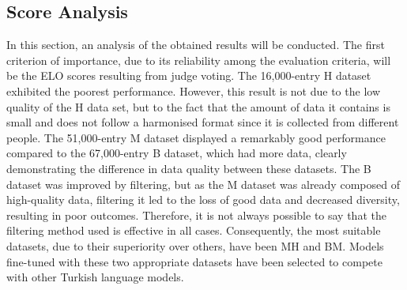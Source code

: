\documentclass[conference]{IEEEtran}
\begin{document}

\subsection{Score Analysis}

In this section, an analysis of the obtained results will be conducted. The first criterion of importance, due to its reliability among the evaluation criteria, will be the ELO scores resulting from judge voting. The 16,000-entry H dataset exhibited the poorest performance. However, this result is not due to the low quality of the H data set, but to the fact that the amount of data it contains is small and does not follow a harmonised format since it is collected from different people. The 51,000-entry M dataset displayed a remarkably good performance compared to the 67,000-entry B dataset, which had more data, clearly demonstrating the difference in data quality between these datasets. The B dataset was improved by filtering, but as the M dataset was already composed of high-quality data, filtering it led to the loss of good data and decreased diversity, resulting in poor outcomes. Therefore, it is not always possible to say that the filtering method used is effective in all cases. Consequently, the most suitable datasets, due to their superiority over others, have been MH and BM. Models fine-tuned with these two appropriate datasets have been selected to compete with other Turkish language models.
\end{document}
